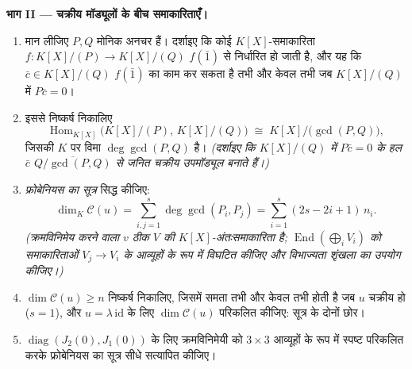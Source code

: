 \begin{problem}
\medskip
\noindent\textbf{भाग II --- चक्रीय मॉड्यूलों के बीच समाकारिताएँ।}
\begin{enumerate}[resume]
  \item मान लीजिए $P, Q$ मोनिक अनचर हैं। दर्शाइए कि कोई
        $K[X]$-समाकारिता $f \colon K[X]/(P) \to K[X]/(Q)$ $f(\bar 1)$ से निर्धारित हो जाती है, और
        यह कि $\bar c \in K[X]/(Q)$ $f(\bar 1)$ का काम कर सकता है तभी और केवल तभी जब
        $K[X]/(Q)$ में $P\bar c = 0$।
  \item इससे निष्कर्ष निकालिए
        \[
        \operatorname{Hom}_{K[X]}\bigl(K[X]/(P),\, K[X]/(Q)\bigr)
        \;\cong\; K[X]\big/\bigl(\gcd(P, Q)\bigr),
        \]
        जिसकी $K$ पर विमा $\deg \gcd(P, Q)$ है। \emph{(दर्शाइए कि $K[X]/(Q)$ में
        $P\bar c = 0$ के हल $\bar c$ $\overline{Q/\gcd(P,Q)}$ से जनित चक्रीय उपमॉड्यूल बनाते
        हैं।)}
  \item \emph{फ्रोबेनियस का सूत्र} सिद्ध कीजिए:
        \[
        \dim_K \mathcal C(u) = \sum_{i,j=1}^{s} \deg\gcd(P_i,
        P_j) = \sum_{i=1}^{s} (2s - 2i + 1)\, n_i .
        \]
        \emph{(क्रमविनिमेय करने वाला $v$ ठीक $V$ की
        $K[X]$-अंतःसमाकारिता है; $\operatorname{End}(\bigoplus_i V_i)$ को समाकारिताओं $V_j \to V_i$ के
        आव्यूहों के रूप में विघटित कीजिए और विभाज्यता शृंखला का
        उपयोग कीजिए।)}
  \item $\dim \mathcal C(u) \geq n$ निष्कर्ष निकालिए, जिसमें समता तभी और केवल तभी होती
        है जब $u$ चक्रीय हो ($s = 1$), और $u = \lambda\,\mathrm{id}$ के लिए $\dim\mathcal C(u)$
        परिकलित कीजिए: सूत्र के दोनों छोर।
  \item $\operatorname{diag}(J_2(0), J_1(0))$ के लिए क्रमविनिमेयी को $3\times3$ आव्यूहों के रूप में
        स्पष्ट परिकलित करके फ्रोबेनियस का सूत्र सीधे सत्यापित
        कीजिए।
\end{enumerate}


\end{problem}
